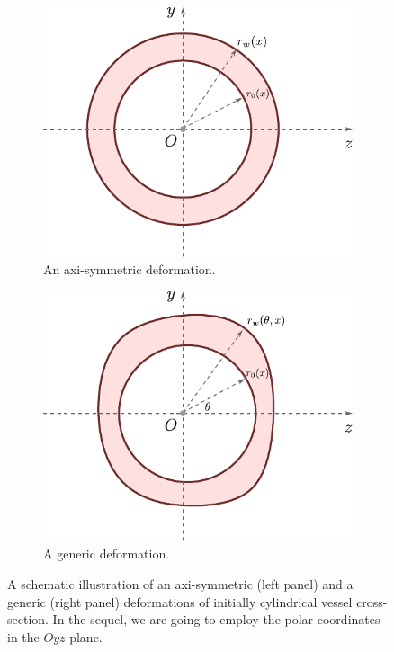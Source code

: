 \documentclass[alpha-refs, 12pt]{wiley-article}
\begin{document}
\begin{figure}
    \centering
    \begin{subfigure}{0.49\textwidth}
        \centering
        \includegraphics[width=\linewidth]{Axis.pdf}
        \caption{An axi-symmetric deformation.}
        \label{fig:axi}
     \end{subfigure}
     \begin{subfigure}{0.49\textwidth}
        \centering
        \includegraphics[width=\linewidth]{Gen.pdf}
        \caption{A generic deformation.}
        \label{fig:gen}
    \end{subfigure}
    \caption{A schematic illustration of an axi-symmetric (left panel) and a generic (right panel) deformations of initially cylindrical vessel cross-section. In the sequel, we are going to employ the polar coordinates in the $Oyz$ plane.}
    \label{fig:axisym}
\end{figure}
\end{document}
